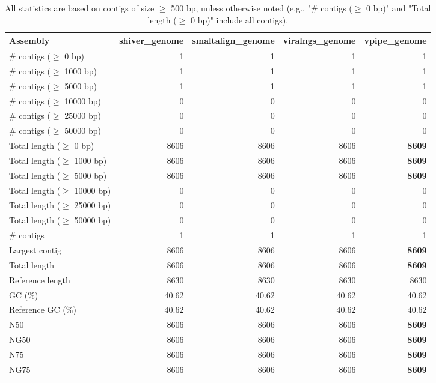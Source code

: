 \documentclass[12pt,a4paper]{article}
\begin{document}
\begin{table}[ht]
\begin{center}
\caption{All statistics are based on contigs of size $\geq$ 500 bp, unless otherwise noted (e.g., "\# contigs ($\geq$ 0 bp)" and "Total length ($\geq$ 0 bp)" include all contigs).}
\begin{tabular}{|l*{4}{|r}|}
\hline
Assembly & shiver\_genome & smaltalign\_genome & viralngs\_genome & vpipe\_genome \\ \hline
\# contigs ($\geq$ 0 bp) & 1 & 1 & 1 & 1 \\ \hline
\# contigs ($\geq$ 1000 bp) & 1 & 1 & 1 & 1 \\ \hline
\# contigs ($\geq$ 5000 bp) & 1 & 1 & 1 & 1 \\ \hline
\# contigs ($\geq$ 10000 bp) & 0 & 0 & 0 & 0 \\ \hline
\# contigs ($\geq$ 25000 bp) & 0 & 0 & 0 & 0 \\ \hline
\# contigs ($\geq$ 50000 bp) & 0 & 0 & 0 & 0 \\ \hline
Total length ($\geq$ 0 bp) & 8606 & 8606 & 8606 & {\bf 8609} \\ \hline
Total length ($\geq$ 1000 bp) & 8606 & 8606 & 8606 & {\bf 8609} \\ \hline
Total length ($\geq$ 5000 bp) & 8606 & 8606 & 8606 & {\bf 8609} \\ \hline
Total length ($\geq$ 10000 bp) & 0 & 0 & 0 & 0 \\ \hline
Total length ($\geq$ 25000 bp) & 0 & 0 & 0 & 0 \\ \hline
Total length ($\geq$ 50000 bp) & 0 & 0 & 0 & 0 \\ \hline
\# contigs & 1 & 1 & 1 & 1 \\ \hline
Largest contig & 8606 & 8606 & 8606 & {\bf 8609} \\ \hline
Total length & 8606 & 8606 & 8606 & {\bf 8609} \\ \hline
Reference length & 8630 & 8630 & 8630 & 8630 \\ \hline
GC (\%) & 40.62 & 40.62 & 40.62 & 40.62 \\ \hline
Reference GC (\%) & 40.62 & 40.62 & 40.62 & 40.62 \\ \hline
N50 & 8606 & 8606 & 8606 & {\bf 8609} \\ \hline
NG50 & 8606 & 8606 & 8606 & {\bf 8609} \\ \hline
N75 & 8606 & 8606 & 8606 & {\bf 8609} \\ \hline
NG75 & 8606 & 8606 & 8606 & {\bf 8609} \\ \hline

\end{tabular}
\end{center}
\end{table}
\end{document}
